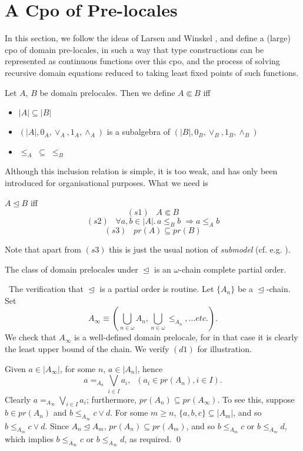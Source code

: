 \section{A Cpo of Pre-locales}
In this section, we follow the ideas of Larsen and Winskel \cite{LW84}, and 
define a (large) cpo of domain pre-locales, in such a way that type constructions can be represented as continuous functions over this cpo, and the process of solving recursive domain equations reduced to taking least fixed points of such functions.

\begin{definition} 
{\rm Let $A$, $B$ be domain prelocales. Then we define $A \Subset B$ iff
\begin{itemize}
\item $|A| \subseteq |B|$
\item $(|A|, 0_{A}, \vee_{A}, 1_{A}, \wedge_{A})$ is a subalgebra of $(|B|, 0_{B}, \vee_{B}, 1_{B}, \wedge_{B})$
\item $\leq_{A} \; \subseteq \; \leq_{B}$
\end{itemize}}
\end{definition}
Although this inclusion relation is simple, it is too weak, and has only been introduced for organisational purposes. What we need is
\begin{definition} 
{\rm $A \trianglelefteq B$ iff}
\[(s1) \;\;\; A \Subset B \]
\[(s2) \;\;\; \forall a, b \in |A|. \, a \leq_{B} b \; \Rightarrow a \leq_{A} b \]
\[(s3) \;\;\; pr(A) \subseteq pr(B) \]
\end{definition}
Note that apart from $(s3)$ this is just the usual notion of {\it submodel} 
(cf. e.g. \cite{CK73}).
\begin{proposition}
The class of domain prelocales under $\trianglelefteq$ is an $\omega$-chain complete partial order.
\end{proposition}

\proof\ The verification that $\trianglelefteq$ is a partial order is routine. Let $\{A_{n}\}$ be a $\trianglelefteq$-chain. Set
\[A_{\infty} \equiv (\bigcup_{n \in \omega}A_{n}, \bigcup_{n \in \omega}\leq_{A_{n}}, \ldots etc.). \]
We check that $A_{\infty}$ is a well-defined domain prelocale, for in that case it is clearly the least upper bound of the chain. We verify $(d1)$ for illustration.

Given $a \in |A_{\infty}|$, for some $n$, $a \in |A_{n}|$,  hence
\[a =_{A_{n}} \bigvee_{i \in I}a_{i}, \;\; (a_{i} \in pr(A_{n}), i \in I).\]
Clearly $a =_{A_{\infty}} \bigvee_{i \in I}a_{i}$; furthermore, $pr(A_{n}) \subseteq pr(A_{\infty})$. To see this, suppose $b \in pr(A_{n})$ and $b \leq_{A_{\infty}} c \vee d$. For some $m \geq n$, $\{a, b, c\} \subseteq |A_{m}|$, and so $b \leq_{A_{m}} c \vee d$. Since $A_{n} \trianglelefteq A_{m}$, $pr(A_{n}) \subseteq pr(A_{m})$, and so $b \leq_{A_{m}} c$ or $b \leq_{A_{m}} d$, which implies $b \leq_{A_{\infty}} c$ or $b \leq_{A_{\infty}} d$, as required. \qed

